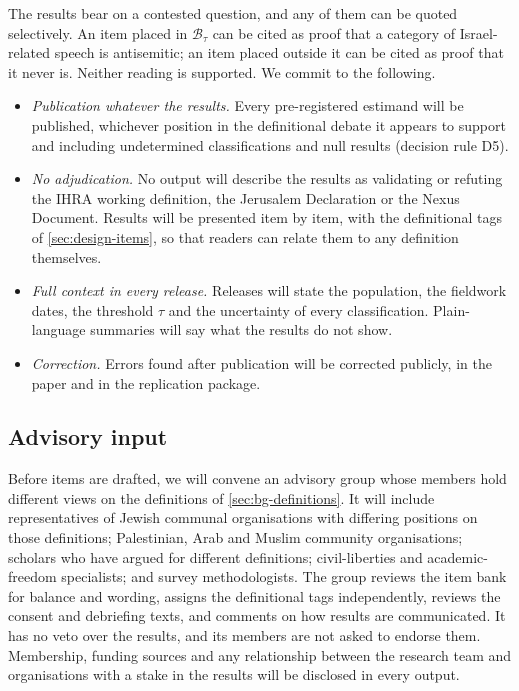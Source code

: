 The results bear on a contested question, and any of them can be quoted selectively. An item placed in $\mathcal{B}_\tau$ can be cited as proof that a category of Israel-related speech is antisemitic; an item placed outside it can be cited as proof that it never is. Neither reading is supported. We commit to the following.
\begin{itemize}
  \item \emph{Publication whatever the results.} Every pre-registered estimand will be published, whichever position in the definitional debate it appears to support and including undetermined classifications and null results (decision rule D5).
  \item \emph{No adjudication.} No output will describe the results as validating or refuting the IHRA working definition, the Jerusalem Declaration or the Nexus Document. Results will be presented item by item, with the definitional tags of \cref{sec:design-items}, so that readers can relate them to any definition themselves.
  \item \emph{Full context in every release.} Releases will state the population, the fieldwork dates, the threshold $\tau$ and the uncertainty of every classification. Plain-language summaries will say what the results do not show.
  \item \emph{Correction.} Errors found after publication will be corrected publicly, in the paper and in the replication package.
\end{itemize}

\subsection{Advisory input}\label{sec:ethics-advisory}

Before items are drafted, we will convene an advisory group whose members hold different views on the definitions of \cref{sec:bg-definitions}. It will include representatives of Jewish communal organisations with differing positions on those definitions; Palestinian, Arab and Muslim community organisations; scholars who have argued for different definitions; civil-liberties and academic-freedom specialists; and survey methodologists. The group reviews the item bank for balance and wording, assigns the definitional tags independently, reviews the consent and debriefing texts, and comments on how results are communicated. It has no veto over the results, and its members are not asked to endorse them. Membership, funding sources and any relationship between the research team and organisations with a stake in the results will be disclosed in every output.

